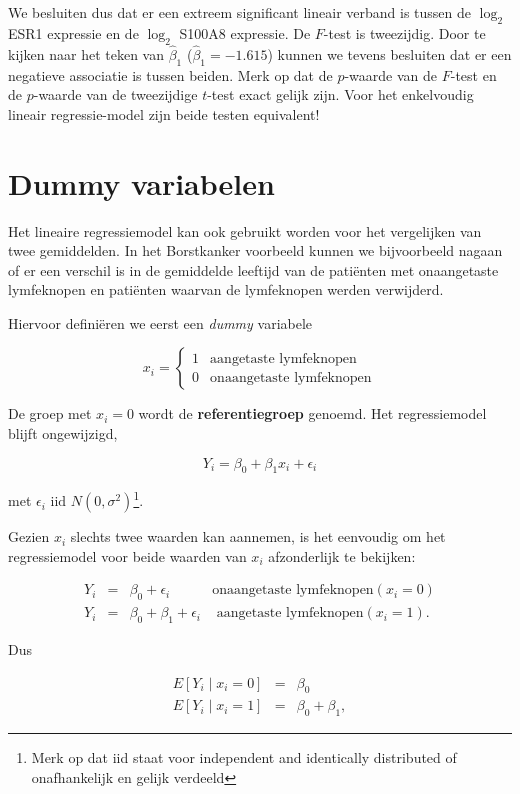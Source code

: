 \documentclass[
  dutch,
  letterpaper,
  12pt]{book}
\theoremstyle{definition}
\theoremstyle{definition}
\theoremstyle{definition}
\theoremstyle{remark}
\begin{document}
We besluiten dus dat er een extreem significant lineair verband is
tussen de \(\log_2\) ESR1 expressie en de \(\log_2\) S100A8 expressie.
De \(F\)-test is tweezijdig. Door te kijken naar het teken van
\(\hat\beta_1\) (\(\hat\beta_1=-1.615\)) kunnen we tevens besluiten dat
er een negatieve associatie is tussen beiden. Merk op dat de
\(p\)-waarde van de \(F\)-test en de \(p\)-waarde van de tweezijdige
\(t\)-test exact gelijk zijn. Voor het enkelvoudig lineair
regressie-model zijn beide testen equivalent!

\section{Dummy variabelen}\label{sec-linDummy}

Het lineaire regressiemodel kan ook gebruikt worden voor het vergelijken
van twee gemiddelden. In het Borstkanker voorbeeld kunnen we
bijvoorbeeld nagaan of er een verschil is in de gemiddelde leeftijd van
de patiënten met onaangetaste lymfeknopen en patiënten waarvan de
lymfeknopen werden verwijderd.

Hiervoor definiëren we eerst een \emph{dummy} variabele

\[x_i = \left\{ \begin{array}{ll}
1 & \text{aangetaste lymfeknopen} \\
0 & \text{onaangetaste lymfeknopen} \end{array}\right.\]

De groep met \(x_i=0\) wordt de \textbf{referentiegroep} genoemd. Het
regressiemodel blijft ongewijzigd,

\[Y_i = \beta_0 + \beta_1 x_i +\epsilon_i\]

met \(\epsilon_i \text{ iid } N(0,\sigma^2)\)\footnote{Merk op dat iid
  staat voor independent and identically distributed of onafhankelijk en
  gelijk verdeeld}.

Gezien \(x_i\) slechts twee waarden kan aannemen, is het eenvoudig om
het regressiemodel voor beide waarden van \(x_i\) afzonderlijk te
bekijken:

\[\begin{array}{lcll}
   Y_i &=& \beta_0 +\epsilon_i &\text{onaangetaste lymfeknopen} (x_i=0) \\
   Y_i &=& \beta_0 + \beta_1 +\epsilon_i &\text{ aangetaste lymfeknopen} (x_i=1) .
 \end{array}\]

Dus

\begin{eqnarray*}
   E\left[Y_i\mid x_i=0\right] &=& \beta_0 \\
   E\left[Y_i\mid x_i=1\right] &=& \beta_0 + \beta_1,
\end{eqnarray*}
\end{document}
